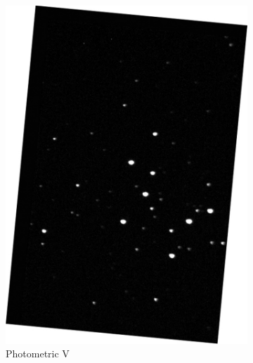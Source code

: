 \documentclass[%
aip,
jmp,
reprint,
floatfix,
nofootinbib
]{revtex4-1}
\begin{document}
\begin{figure}[H]
\begin{subfigure}[]{0.3\textwidth}
			\includegraphics[width=\linewidth]{figs/v.pdf}
			\caption{Photometric V}
			\label{fig:v}
		\end{subfigure}
		\begin{subfigure}[]{0.3\textwidth}
			\centering

\end{subfigure}
\end{figure}
\end{document}
